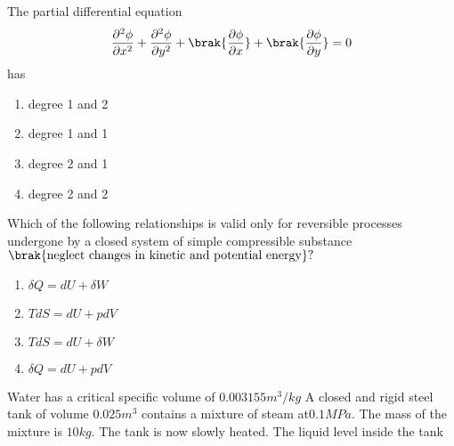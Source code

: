 \bigskip
\item The partial differential equation 
\begin{align*}
    \frac{\partial^{2}\phi}{\partial x^{2}}+\frac{\partial^{2}\phi}{\partial y^{2}}+\brak{\frac{\partial\phi}{\partial x}}+\brak{\frac{\partial\phi}{\partial y}}=0
\end{align*}
has
\begin{multicols}{2}
    \begin{enumerate}
        \item degree 1 and 2
        \item degree 1 and 1
        \item degree 2 and 1
        \item degree 2 and 2
    \end{enumerate}
\end{multicols}
\bigskip
\item Which of the following relationships is valid only for reversible processes undergone by a closed system of simple compressible substance $\brak{\text{neglect changes in kinetic and potential energy}}?$
\begin{multicols}{2}
    \begin{enumerate}
        \item $\delta Q = dU+\delta W $
        \item $T dS=dU+ p dV$
        \item $T dS=dU +\delta W $
        \item $\delta Q =dU+p dV$
    \end{enumerate}
\end{multicols}
\bigskip
\item  Water has a critical specific volume of $0.003155m ^ {3} / kg$ A closed and rigid steel tank of volume $0.025 m^{3}$ contains a mixture of steam at$ 0.1 MPa.$ The mass of the mixture is $10 kg.$ The tank is now slowly heated. The liquid level inside the tank

